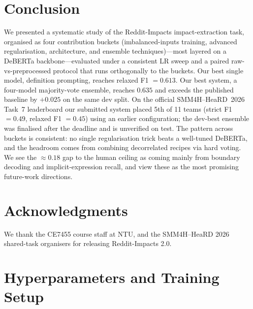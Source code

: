 \documentclass[11pt]{article}
\begin{document}
\section{Conclusion}
\label{sec:conclusion}

We presented a systematic study of the Reddit-Impacts impact-extraction
task, organised as four contribution buckets (imbalanced-inputs
training, advanced regularisation, architecture, and ensemble
techniques)---most layered on a DeBERTa backbone---evaluated under a
consistent LR sweep and a paired raw-vs-preprocessed protocol that
runs orthogonally to the buckets. Our best single model, definition
prompting, reaches relaxed F1 $= 0.613$. Our best system, a four-model
majority-vote ensemble, reaches $0.635$ and exceeds the published
baseline by $+0.025$ on the same dev split. On the official
SMM4H--HeaRD~2026 Task~7 leaderboard
\citep{smm4h-heard-overview-2026} our submitted system placed 5th
of 11 teams (strict F1 $= 0.49$, relaxed F1 $= 0.45$) using an earlier
configuration; the dev-best ensemble was finalised after the deadline
and is unverified on test. The pattern across buckets is consistent:
no single regularisation trick beats a well-tuned DeBERTa, and the
headroom comes from combining decorrelated recipes via hard voting.
We see the $\approx 0.18$ gap to the human ceiling as coming mainly
from boundary decoding and implicit-expression recall, and view these
as the most promising future-work directions.

\section*{Acknowledgments}

We thank the CE7455 course staff at NTU, and the SMM4H--HeaRD 2026
shared-task organisers for releasing Reddit-Impacts 2.0.



\appendix

\section{Hyperparameters and Training Setup}
\label{sec:hyperparams}
\end{document}
